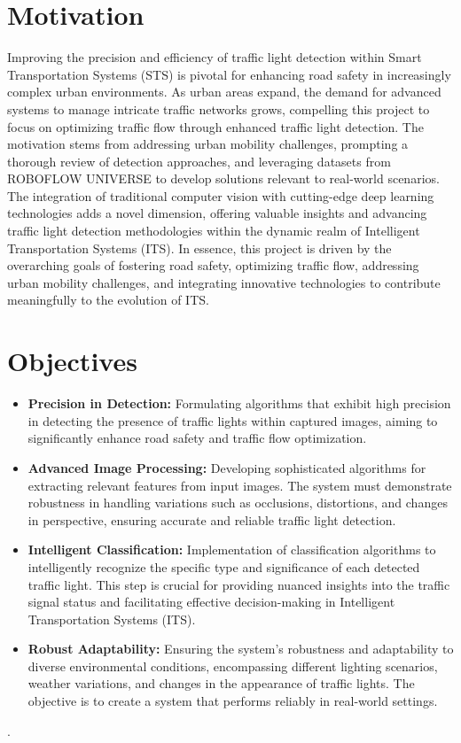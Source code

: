 \documentclass[12 pt]{report}
\begin{document}
\section{Motivation}
\justify
Improving the precision and efficiency of traffic light detection within Smart Transportation Systems (STS) is pivotal for enhancing road safety in increasingly complex urban environments. As urban areas expand, the demand for advanced systems to manage intricate traffic networks grows, compelling this project to focus on optimizing traffic flow through enhanced traffic light detection. The motivation stems from addressing urban mobility challenges, prompting a thorough review of detection approaches, and leveraging datasets from ROBOFLOW UNIVERSE to develop solutions relevant to real-world scenarios. The integration of traditional computer vision with cutting-edge deep learning technologies adds a novel dimension, offering valuable insights and advancing traffic light detection methodologies within the dynamic realm of Intelligent Transportation Systems (ITS). In essence, this project is driven by the overarching goals of fostering road safety, optimizing traffic flow, addressing urban mobility challenges, and integrating innovative technologies to contribute meaningfully to the evolution of ITS.
\flushleft
\section{Objectives}
\begin{justify}
\begin{itemize}
  \item \textbf{Precision in Detection:} Formulating algorithms that exhibit high precision in detecting the presence of traffic lights within captured images, aiming to significantly enhance road safety and traffic flow optimization.

  \item \textbf{Advanced Image Processing:} Developing sophisticated algorithms for extracting relevant features from input images. The system must demonstrate robustness in handling variations such as occlusions, distortions, and changes in perspective, ensuring accurate and reliable traffic light detection.

  \item \textbf{Intelligent Classification:} Implementation of classification algorithms to intelligently recognize the specific type and significance of each detected traffic light. This step is crucial for providing nuanced insights into the traffic signal status and facilitating effective decision-making in Intelligent Transportation Systems (ITS).

  \item \textbf{Robust Adaptability:} Ensuring the system's robustness and adaptability to diverse environmental conditions, encompassing different lighting scenarios, weather variations, and changes in the appearance of traffic lights. The objective is to create a system that performs reliably in real-world settings.
\end{itemize}.
\end{justify}
\end{document}
